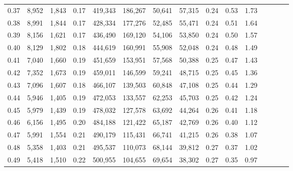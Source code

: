 \begin{tabular}{rrrcrrrrrrrrrrr}
0.37 &   8,952 &  1,843 &                                       0.17 &  419,343 &  186,267 &   50,641 &   57,315 &  0.24 &  0.53 &                         1.73 \\
0.38 &   8,991 &  1,844 &                                       0.17 &  428,334 &  177,276 &   52,485 &   55,471 &  0.24 &  0.51 &                         1.64 \\
0.39 &   8,156 &  1,621 &                                       0.17 &  436,490 &  169,120 &   54,106 &   53,850 &  0.24 &  0.50 &                         1.57 \\
0.40 &   8,129 &  1,802 &                                       0.18 &  444,619 &  160,991 &   55,908 &   52,048 &  0.24 &  0.48 &                         1.49 \\
0.41 &   7,040 &  1,660 &                                       0.19 &  451,659 &  153,951 &   57,568 &   50,388 &  0.25 &  0.47 &                         1.43 \\
0.42 &   7,352 &  1,673 &                                       0.19 &  459,011 &  146,599 &   59,241 &   48,715 &  0.25 &  0.45 &                         1.36 \\
0.43 &   7,096 &  1,607 &                                       0.18 &  466,107 &  139,503 &   60,848 &   47,108 &  0.25 &  0.44 &                         1.29 \\
0.44 &   5,946 &  1,405 &                                       0.19 &  472,053 &  133,557 &   62,253 &   45,703 &  0.25 &  0.42 &                         1.24 \\
0.45 &   5,979 &  1,439 &                                       0.19 &  478,032 &  127,578 &   63,692 &   44,264 &  0.26 &  0.41 &                         1.18 \\
0.46 &   6,156 &  1,495 &                                       0.20 &  484,188 &  121,422 &   65,187 &   42,769 &  0.26 &  0.40 &                         1.12 \\
0.47 &   5,991 &  1,554 &                                       0.21 &  490,179 &  115,431 &   66,741 &   41,215 &  0.26 &  0.38 &                         1.07 \\
0.48 &   5,358 &  1,403 &                                       0.21 &  495,537 &  110,073 &   68,144 &   39,812 &  0.27 &  0.37 &                         1.02 \\
0.49 &   5,418 &  1,510 &                                       0.22 &  500,955 &  104,655 &   69,654 &   38,302 &  0.27 &  0.35 &                         0.97 \\

\end{tabular}
